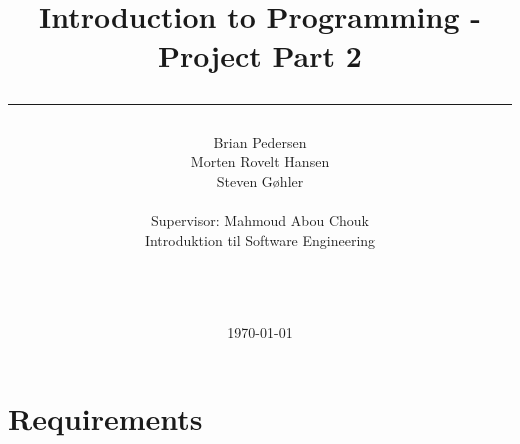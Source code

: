 \documentclass[a4paper,10pt]{article}
\title{Introduction to Programming - Project Part 2 \\\rule{10cm}{0.5mm}}
\author{Brian Pedersen\\
Morten Rovelt Hansen\\
Steven Gøhler\\
\\Supervisor: Mahmoud Abou Chouk\\ Introduktion til Software Engineering\\\rule{5.5cm}{0.5mm}\\}
\date{\today}
\begin{document}
\maketitle

\vfill
\newpage
\tableofcontents

\newpage
\section{Requirements}
 
\end{document}
